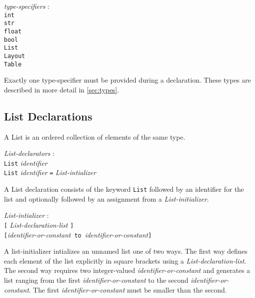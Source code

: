 \documentclass{article}
\begin{document}
\begin{tabbing}
	\= \emph{type}\=\emph{-specifiers} : \\
		\>\> \texttt{int} \\
		\>\> \texttt{str} \\
		\>\> \texttt{float} \\
		\>\> \texttt{bool} \\
		\>\> \texttt{List} \\
		\>\> \texttt{Layout} \\
		\>\> \texttt{Table} \\
\end{tabbing}

Exactly one type-specifier must be provided during a declaration. These types are described in more detail in \ref{sec:types}.

\subsection{List Declarations}
\label{sec:list}
A List is an ordered collection of elements of the same type. 
\begin{tabbing}
	\= \emph{List}\=\emph{-declarators} : \\
		\> \> \texttt{List} \emph{identifier} \\
		\>\> \texttt{List} \emph{identifier} \texttt{=} \emph{List-intializer } \texttt{} 
\end{tabbing}
A List declaration consists of the keyword \texttt{List} followed by an identifier for the list and optionally followed by an assignment from a \emph{List-initializer}.

\begin{tabbing}
	\= \emph{List}\=\emph{-intializer} : \\
		\> \> \texttt{[} \emph{List-declaration-list} \texttt{]} \\
		\>\> \texttt{[}\emph{identifier-or-constant}\texttt{ to }\emph{identifier-or-constant}\texttt{]}
\end{tabbing}

A list-initializer intializes an unnamed list one of two ways. The first way defines each element of the list explicitly in square brackets using a \emph{List-declaration-list}. The second way requires two integer-valued \emph{identifier-or-constant} and generates a list ranging from the first \emph{identifier-or-constant} to the second \emph{identifier-or-constant}. The first \emph{identifier-or-constant} must be smaller than the second.
\end{document}

